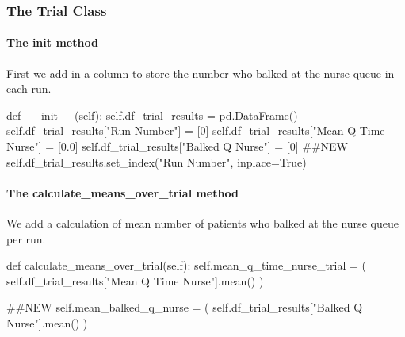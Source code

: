 \documentclass[
  letterpaper,
  DIV=11,
  numbers=noendperiod]{scrreprt}
\let\oldparagraph\paragraph
\renewcommand{\paragraph}[1]{\oldparagraph{#1}\mbox{}}
\newenvironment{Shaded}{\begin{snugshade}}{\end{snugshade}}
\newcommand{\CommentTok}[1]{\textcolor[rgb]{0.37,0.37,0.37}{#1}}
\newcommand{\DecValTok}[1]{\textcolor[rgb]{0.68,0.00,0.00}{#1}}
\newcommand{\FloatTok}[1]{\textcolor[rgb]{0.68,0.00,0.00}{#1}}
\newcommand{\FunctionTok}[1]{\textcolor[rgb]{0.28,0.35,0.67}{#1}}
\newcommand{\KeywordTok}[1]{\textcolor[rgb]{0.00,0.23,0.31}{#1}}
\newcommand{\NormalTok}[1]{\textcolor[rgb]{0.00,0.23,0.31}{#1}}
\newcommand{\OperatorTok}[1]{\textcolor[rgb]{0.37,0.37,0.37}{#1}}
\newcommand{\StringTok}[1]{\textcolor[rgb]{0.13,0.47,0.30}{#1}}
\newcommand{\VariableTok}[1]{\textcolor[rgb]{0.07,0.07,0.07}{#1}}
\begin{document}
\subsubsection{The Trial Class}\label{the-trial-class-5}

\paragraph{\texorpdfstring{The \textbf{init}
method}{The init method}}\label{the-init-method-5}

First we add in a column to store the number who balked at the nurse
queue in each run.

\begin{Shaded}
\begin{Highlighting}[]
\KeywordTok{def}  \FunctionTok{\_\_init\_\_}\NormalTok{(}\VariableTok{self}\NormalTok{):}
    \VariableTok{self}\NormalTok{.df\_trial\_results }\OperatorTok{=}\NormalTok{ pd.DataFrame()}
    \VariableTok{self}\NormalTok{.df\_trial\_results[}\StringTok{"Run Number"}\NormalTok{] }\OperatorTok{=}\NormalTok{ [}\DecValTok{0}\NormalTok{]}
    \VariableTok{self}\NormalTok{.df\_trial\_results[}\StringTok{"Mean Q Time Nurse"}\NormalTok{] }\OperatorTok{=}\NormalTok{ [}\FloatTok{0.0}\NormalTok{]}
    \VariableTok{self}\NormalTok{.df\_trial\_results[}\StringTok{"Balked Q Nurse"}\NormalTok{] }\OperatorTok{=}\NormalTok{ [}\DecValTok{0}\NormalTok{] }\CommentTok{\#\#NEW}
    \VariableTok{self}\NormalTok{.df\_trial\_results.set\_index(}\StringTok{"Run Number"}\NormalTok{, inplace}\OperatorTok{=}\VariableTok{True}\NormalTok{)}
\end{Highlighting}
\end{Shaded}

\paragraph{The calculate\_means\_over\_trial
method}\label{the-calculate_means_over_trial-method-1}

We add a calculation of mean number of patients who balked at the nurse
queue per run.

\begin{Shaded}
\begin{Highlighting}[]
    \KeywordTok{def}\NormalTok{ calculate\_means\_over\_trial(}\VariableTok{self}\NormalTok{):}
        \VariableTok{self}\NormalTok{.mean\_q\_time\_nurse\_trial }\OperatorTok{=}\NormalTok{ (}
            \VariableTok{self}\NormalTok{.df\_trial\_results[}\StringTok{"Mean Q Time Nurse"}\NormalTok{].mean()}
\NormalTok{        )}

        \CommentTok{\#\#NEW}
        \VariableTok{self}\NormalTok{.mean\_balked\_q\_nurse }\OperatorTok{=}\NormalTok{ (}
            \VariableTok{self}\NormalTok{.df\_trial\_results[}\StringTok{"Balked Q Nurse"}\NormalTok{].mean()}
\NormalTok{        )}
\end{Highlighting}
\end{Shaded}
\end{document}
